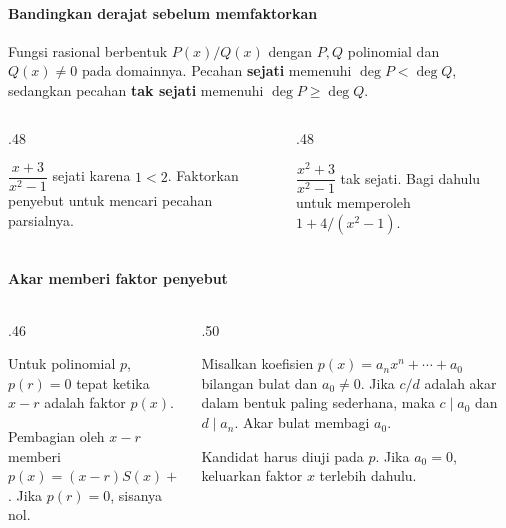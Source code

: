 \documentclass{../../kalkulus-ppt}
\begin{document}
\begin{frame}{\insertsection}
    \framesubtitle{Bandingkan derajat sebelum memfaktorkan}
    \begin{definisi}
        Fungsi rasional berbentuk $P(x)/Q(x)$ dengan $P,Q$ polinomial
        dan $Q(x)\ne0$ pada domainnya. Pecahan \textbf{sejati} memenuhi
        $\deg P<\deg Q$, sedangkan pecahan \textbf{tak sejati} memenuhi
        $\deg P\ge\deg Q$.
    \end{definisi}
    \begin{columns}[t,onlytextwidth]
        \begin{column}{.48\textwidth}
            \begin{contoh}
                $\dfrac{x+3}{x^2-1}$ sejati karena $1<2$.
                Faktorkan penyebut untuk mencari pecahan parsialnya.
            \end{contoh}
        \end{column}
        \begin{column}{.48\textwidth}
            \begin{contoh}
                $\dfrac{x^2+3}{x^2-1}$ tak sejati. Bagi dahulu
                untuk memperoleh $1+4/(x^2-1)$.
            \end{contoh}
        \end{column}
    \end{columns}
\end{frame}

\begin{frame}{\insertsection}
    \framesubtitle{Akar memberi faktor penyebut}
    \begin{columns}[t,onlytextwidth]
        \begin{column}{.46\textwidth}
            \begin{teorema}
                Untuk polinomial $p$,
                $p(r)=0$ tepat ketika $x-r$ adalah faktor $p(x)$.
            \end{teorema}
            Pembagian oleh $x-r$ memberi $p(x)=(x-r)S(x)+p(r)$.
            Jika $p(r)=0$, sisanya nol.
        \end{column}
        \begin{column}{.50\textwidth}
            \begin{teorema}
                Misalkan koefisien $p(x)=a_nx^n+\cdots+a_0$ bilangan bulat
                dan $a_0\ne0$. Jika $c/d$ adalah akar dalam bentuk paling sederhana,
                maka $c\mid a_0$ dan $d\mid a_n$. Akar bulat membagi $a_0$.
            \end{teorema}
            Kandidat harus diuji pada $p$. Jika $a_0=0$, keluarkan faktor $x$
            terlebih dahulu.
        \end{column}
    \end{columns}
\end{frame}
\end{document}
